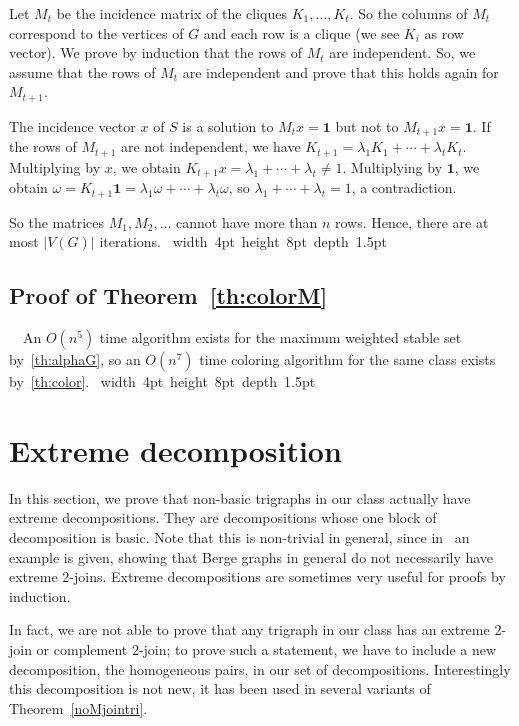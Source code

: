 \documentclass[11 pt] {article}
\newcommand\blackslug{\hbox{\hskip 1pt \vrule width 4pt height 8pt depth 1.5pt
        \hskip 1pt}}
\newcommand\bbox{\hfill \quad \blackslug \medbreak}
\newcounter{claim}
\newcommand{\Proof}{\setcounter{claim}{0}\noindent{\bf Proof.}\ \ }
\begin{document}
  Let $M_t$ be the incidence matrix of the cliques $K_1, \dots, K_t$.
  So the columns of $M_t$ correspond to the vertices of $G$ and each
  row is a clique (we see $K_i$ as row vector).  We prove by induction
  that the rows of $M_t$ are independent.  So, we assume that the rows
  of $M_t$ are independent and prove that this holds again for $M_{t+1}$.

  The incidence vector $x$ of $S$ is a solution to $M_tx = \mathbf{1}$
  but not to $M_{t+1}x = \mathbf{1}$.  If the rows of $M_{t+1}$
  are not independent, we have $K_{t+1} = \lambda_1 K_1 + \cdots +
  \lambda_t K_t$.  Multiplying by $x$, we obtain $K_{t+1}x = \lambda_1
  + \cdots + \lambda_t \neq 1$.  Multiplying by $\mathbf{1}$, we
  obtain $\omega = K_{t+1}\mathbf{1} = \lambda_1 \omega + \cdots +
  \lambda_t \omega$, so $\lambda_1 + \cdots + \lambda_t = 1$, a
  contradiction.

  So the matrices $M_1, M_2, \dots$ cannot have more than $n$
  rows. Hence, there are at most $|V(G)|$ iterations.
\bbox

\subsection*{Proof of Theorem~\ref{th:colorM}}

\Proof An $O(n^5)$ time algorithm exists for the maximum weighted
stable set  by~\ref{th:alphaG}, so an $O(n^7)$ time coloring
algorithm for the same class exists by~\ref{th:color}.  \bbox

\section{Extreme decomposition}
\label{sec:ext}

In this section, we prove that non-basic trigraphs in our class
actually have extreme decompositions. They are decompositions whose
one block of decomposition is basic. Note that this is non-trivial in
general, since in~\cite{nicolas.kristina:2-join} an example
is given, showing that Berge graphs in general do not necessarily have
extreme $2$-joins.  Extreme decompositions are sometimes very useful
for proofs by induction.

In fact, we are not able to prove that any trigraph in our class has
an extreme $2$-join or complement $2$-join; to prove such a statement,
we have to include a new decomposition, the homogeneous pairs, in our
set of decompositions.  Interestingly this decomposition is not new,
it has been used in several variants of Theorem~\ref{noMjointri}.
\end{document}
